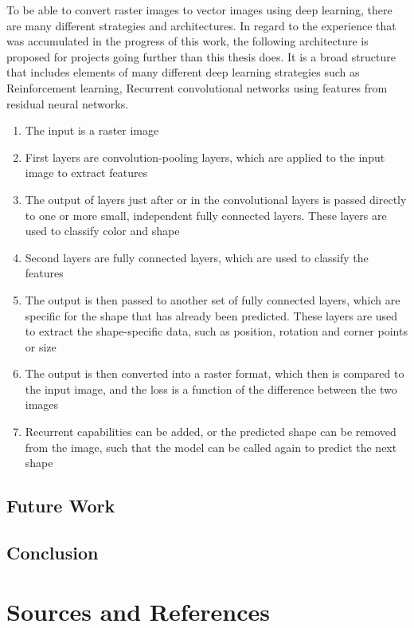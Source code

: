 \documentclass[12pt, a4paper, titlepage]{report}
\begin{document}
To be able to convert raster images to vector images using deep learning, there are many different strategies and architectures. In regard to the experience that was accumulated in the progress of this work, the following architecture is proposed for projects going further than this thesis does. It is a broad structure that includes elements of many different deep learning strategies such as Reinforcement learning, Recurrent convolutional networks using features from residual neural networks.

\begin{enumerate}
   \item The input is a raster image
   \item First layers are convolution-pooling layers, which are applied to the input image to extract features
   \item The output of layers just after or in the convolutional layers is passed directly to one or more small, independent fully connected layers. These layers are used to classify color and shape
   \item Second layers are fully connected layers, which are used to classify the features
   \item The output is then passed to another set of fully connected layers, which are specific for the shape that has already been predicted. These layers are used to extract the shape-specific data, such as position, rotation and corner points or size
   \item The output is then converted into a raster format, which then is compared to the input image, and the loss is a function of the difference between the two images

   \item Recurrent capabilities can be added, or the predicted shape can be removed from the image, such that the model can be called again to predict the next shape
\end{enumerate}

\section{Future Work}

\section{Conclusion}


\chapter{Sources and References}

\printbibliography
\end{document}
